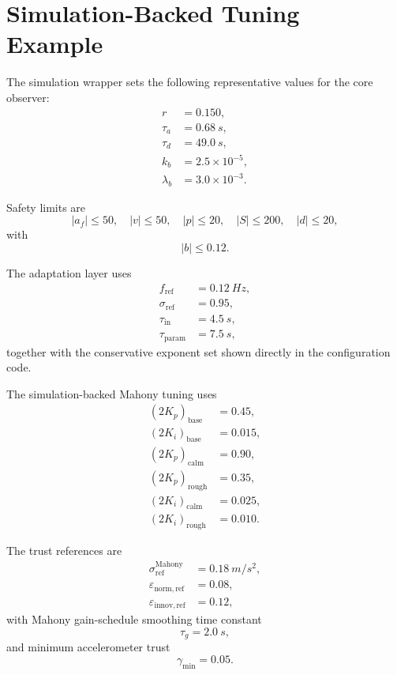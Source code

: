 \documentclass[conference]{IEEEtran}
\begin{document}
\section{Simulation-Backed Tuning Example}\label{sec:tuning}

The simulation wrapper sets the following representative values for the core
observer:
\begin{align}
r &= 0.150,\\
\tau_a &= 0.68~\si{s},\\
\tau_d &= 49.0~\si{s},\\
k_b &= 2.5\times10^{-5},\\
\lambda_b &= 3.0\times10^{-3}.
\end{align}

Safety limits are
\begin{equation}
|a_f|\le 50,\quad |v|\le 50,\quad |p|\le 20,\quad |S|\le 200,\quad |d|\le 20,
\end{equation}
with
\begin{equation}
|b|\le 0.12.
\end{equation}

The adaptation layer uses
\begin{align}
f_{\mathrm{ref}} &= 0.12~\si{Hz},\\
\sigma_{\mathrm{ref}} &= 0.95,\\
\tau_{\mathrm{in}} &= 4.5~\si{s},\\
\tau_{\mathrm{param}} &= 7.5~\si{s},
\end{align}
together with the conservative exponent set shown directly in the configuration
code.

The simulation-backed Mahony tuning uses
\begin{align}
(2K_p)_{\mathrm{base}} &= 0.45,\\
(2K_i)_{\mathrm{base}} &= 0.015,\\
(2K_p)_{\mathrm{calm}} &= 0.90,\\
(2K_p)_{\mathrm{rough}} &= 0.35,\\
(2K_i)_{\mathrm{calm}} &= 0.025,\\
(2K_i)_{\mathrm{rough}} &= 0.010.
\end{align}

The trust references are
\begin{align}
\sigma_{\mathrm{ref}}^{\mathrm{Mahony}} &= 0.18~\si{m/s^2},\\
\varepsilon_{\mathrm{norm,ref}} &= 0.08,\\
\varepsilon_{\mathrm{innov,ref}} &= 0.12,
\end{align}
with Mahony gain-schedule smoothing time constant
\begin{equation}
\tau_g = 2.0~\si{s},
\end{equation}
and minimum accelerometer trust
\begin{equation}
\gamma_{\min} = 0.05.
\end{equation}
\end{document}
